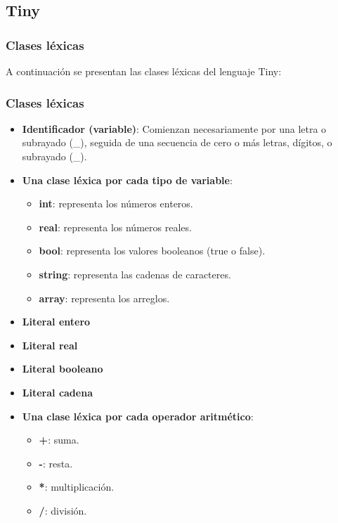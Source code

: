 \documentclass[11pt]{article}
\begin{document}
    \subsection{Tiny}
        \subsubsection{Clases léxicas}
        A continuación se presentan las clases léxicas del lenguaje Tiny:
        \subsubsection*{Clases léxicas}
        \begin{itemize}
            \item \textbf{Identificador (variable)}: Comienzan necesariamente por una letra o subrayado (\_), seguida de una secuencia de cero o más letras, dígitos, o subrayado (\_).
            \item \textbf{Una clase léxica por cada tipo de variable}:
            \begin{itemize}
                \item \textbf{int}: representa los números enteros.
                \item \textbf{real}: representa los números reales.
                \item \textbf{bool}: representa los valores booleanos (true o false).
                \item \textbf{string}: representa las cadenas de caracteres.
                \item \textbf{array}: representa los arreglos.
            \end{itemize}
            \item \textbf{Literal entero}
            \item \textbf{Literal real}
            \item \textbf{Literal booleano}
            \item \textbf{Literal cadena}
            \item \textbf{Una clase léxica por cada operador aritmético}:
            \begin{itemize}
                \item \textbf{+}: suma.
                \item \textbf{-}: resta.
                \item \textbf{*}: multiplicación.
                \item \textbf{/}: división.
            \end{itemize}

\end{itemize}
\end{document}
